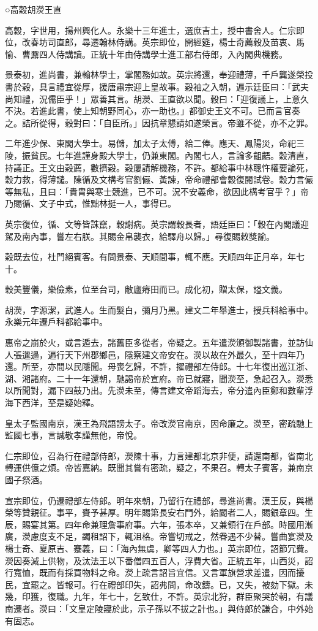 
\begin{pinyinscope}
○高穀胡濙王直

高穀，字世用，揚州興化人。永樂十三年進士，選庶吉土，授中書舍人。仁宗即位，改春坊司直郎，尋遷翰林侍講。英宗即位，開經筵，楊士奇薦穀及苗衷、馬愉、曹鼐四人侍講讀。正統十年由侍講學士進工部右侍郎，入內閣典機務。

景泰初，進尚書，兼翰林學士，掌閣務如故。英宗將還，奉迎禮薄，千戶龔遂榮投書於穀，具言禮宜從厚，援唐肅宗迎上皇故事。穀袖之入朝，遍示廷臣曰：「武夫尚知禮，況儒臣乎！」眾善其言。胡濙、王直欲以聞。穀曰：「迎復議上，上意久不決。若進此書，使上知朝野同心，亦一助也。」都御史王文不可。已而言官奏之。詰所從得，穀對曰：「自臣所。」因抗章懇請如遂榮言。帝雖不從，亦不之罪。

二年進少保、東閣大學士。易儲，加太子太傅，給二俸。應天、鳳陽災，命祀三陵，振貧民。七年進謹身殿大學士，仍兼東閣。內閣七人，言論多齟齬。穀清直，持議正。王文由穀薦，數擠穀。穀屢請解機務，不許。都給事中林聰忤權要論死，穀力救，得薄譴。陳循及文構考官劉儼、黃諫，帝命禮部會穀復閱試卷。穀力言儼等無私，且曰：「貴胄與寒士競進，已不可。況不安義命，欲因此構考官乎？」帝乃賜循、文子中式，惟黜林挺一人，事得已。

英宗復位，循、文等皆誅竄，穀謝病。英宗謂穀長者，語廷臣曰：「穀在內閣議迎駕及南內事，嘗左右朕。其賜金帛襲衣，給驛舟以歸。」尋復賜敕獎諭。

穀既去位，杜門絕賓客。有問景泰、天順間事，輒不應。天順四年正月卒，年七十。

穀美豐儀，樂儉素，位至台司，敝廬瘠田而已。成化初，贈太保，謚文義。

胡濙，字源潔，武進人。生而髮白，彌月乃黑。建文二年舉進士，授兵科給事中。永樂元年遷戶科都給事中。

惠帝之崩於火，或言遁去，諸舊臣多從者，帝疑之。五年遣濙頒御製諸書，並訪仙人張邋遢，遍行天下州郡鄉邑，隱察建文帝安在。濙以故在外最久，至十四年乃還。所至，亦間以民隱聞。母喪乞歸，不許，擢禮部左侍郎。十七年復出巡江浙、湖、湘諸府。二十一年還朝，馳謁帝於宣府。帝已就寢，聞濙至，急起召入。濙悉以所聞對，漏下四鼓乃出。先濙未至，傳言建文帝蹈海去，帝分遣內臣鄭和數輩浮海下西洋，至是疑始釋。

皇太子監國南京，漢王為飛語謗太子。帝改濙官南京，因命廉之。濙至，密疏馳上監國七事，言誠敬孝謹無他，帝悅。

仁宗即位，召為行在禮部侍郎，濙陳十事，力言建都北京非便，請還南都，省南北轉運供億之煩。帝皆嘉納。既聞其嘗有密疏，疑之，不果召。轉太子賓客，兼南京國子祭酒。

宣宗即位，仍遷禮部左侍郎。明年來朝，乃留行在禮部，尋進尚書。漢王反，與楊榮等贊親征。事平，賚予甚厚。明年賜第長安右門外，給閽者二人，賜銀章四。生辰，賜宴其第。四年命兼理詹事府事。六年，張本卒，又兼領行在戶部。時國用漸廣，濙慮度支不足，蠲租詔下，輒沮格。帝嘗切戒之，然眷遇不少替。嘗曲宴濙及楊士奇、夏原吉、蹇義，曰：「海內無虞，卿等四人力也。」英宗即位，詔節冗費。濙因奏減上供物，及汰法王以下番僧四五百人，浮費大省。正統五年，山西災，詔行寬恤，既而有採買物料之命。濙上疏言詔旨宜信。又言軍旗營求差遣，因而擾民，宜罷之。皆報可。行在禮部印失，詔弗問，命改鑄。已，又失，被劾下獄。未幾，印獲，復職。九年，年七十，乞致仕，不許。英宗北狩，群臣聚哭於朝，有議南遷者。濙曰：「文皇定陵寢於此，示子孫以不拔之計也。」與侍郎於謙合，中外始有固志。


\end{pinyinscope}
